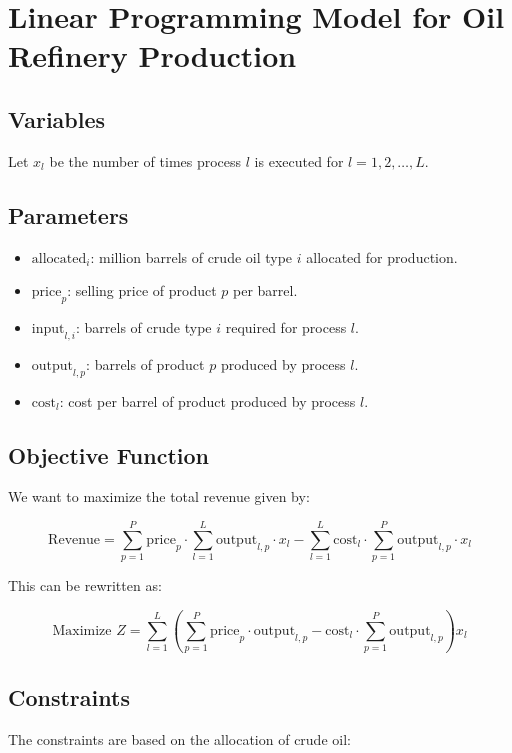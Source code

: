 \documentclass{article}
\begin{document}
\section*{Linear Programming Model for Oil Refinery Production}

\subsection*{Variables}
Let \( x_l \) be the number of times process \( l \) is executed for \( l = 1, 2, \ldots, L \).

\subsection*{Parameters}
\begin{itemize}
    \item \( \text{allocated}_i \): million barrels of crude oil type \( i \) allocated for production.
    \item \( \text{price}_p \): selling price of product \( p \) per barrel.
    \item \( \text{input}_{l,i} \): barrels of crude type \( i \) required for process \( l \).
    \item \( \text{output}_{l,p} \): barrels of product \( p \) produced by process \( l \).
    \item \( \text{cost}_l \): cost per barrel of product produced by process \( l \).
\end{itemize}

\subsection*{Objective Function}
We want to maximize the total revenue given by:

\[
\text{Revenue} = \sum_{p=1}^{P} \text{price}_p \cdot \sum_{l=1}^{L} \text{output}_{l,p} \cdot x_l - \sum_{l=1}^{L} \text{cost}_l \cdot \sum_{p=1}^{P} \text{output}_{l,p} \cdot x_l
\]

This can be rewritten as:

\[
\text{Maximize } Z = \sum_{l=1}^{L} \left( \sum_{p=1}^{P} \text{price}_p \cdot \text{output}_{l,p} - \text{cost}_l \cdot \sum_{p=1}^{P} \text{output}_{l,p} \right) x_l
\]

\subsection*{Constraints}
The constraints are based on the allocation of crude oil:
\end{document}
